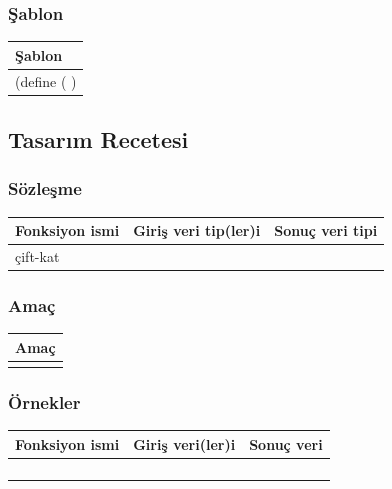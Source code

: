 \documentclass[12pt, a4paper]{article}
\newcommand\fillin[1][3cm]{\makebox[#1]{\dotfill}}
\begin{document}
\subsubsection*{Şablon}
\begin{tabular}{| p{17cm} |  }
\hline			
Şablon\\
\hline
\vspace{0,5cm}
\vspace{0,2cm}
(define (\fillin[2cm] \hspace{1cm}  \fillin[8cm] ) \\[30ex]
\hline  
\end{tabular}

\newpage
\subsection*{Tasarım Recetesi}
\subsubsection*{Sözleşme}
\begin{tabular}{| p{4cm} | p{8cm} | p{4cm} |  }
\hline			
Fonksiyon ismi&Giriş veri tip(ler)i&Sonuç veri tipi\\
\hline
çift-kat& & \\[10ex]
\hline  
\end{tabular}

\subsubsection*{Amaç}
\begin{tabular}{| p{17cm} |  }
\hline			
Amaç\\
\hline
 \\[10ex]
\hline  
\end{tabular}

\subsubsection*{Örnekler}
\begin{tabular}{| p{4cm} | p{8cm} | p{4cm} |  }
\hline			
Fonksiyon ismi&Giriş veri(ler)i&Sonuç veri\\
\hline
& & \\[6ex]
\hline  
& & \\[6ex]
\hline  
& & \\[6ex]
\hline  
& & \\[6ex]
\hline  
\end{tabular}
\end{document}
